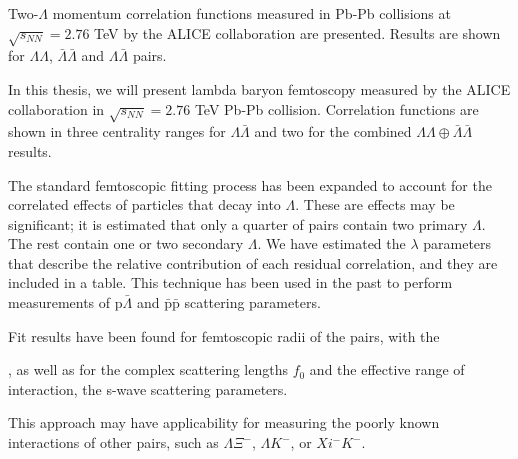 Two-$\Lambda$ momentum correlation functions measured in Pb-Pb collisions at $\sqrt{s_{NN}}=2.76$ TeV by the ALICE collaboration are presented.  Results are shown for $\Lambda\Lambda$, $\bar{\Lambda}\bar{\Lambda}$ and $\Lambda\bar{\Lambda}$ pairs.


In this thesis, we will present lambda baryon femtoscopy measured by the ALICE collaboration in $\sqrt{s_{NN}}=2.76$ TeV Pb-Pb collision.
Correlation functions are shown in three centrality ranges for $\Lambda\bar{\Lambda}$ and two for the combined $\Lambda\Lambda\oplus\bar{\Lambda}\bar{\Lambda}$ results.


The standard femtoscopic fitting process has been expanded to account for the correlated effects of particles that decay into $\Lambda$. %
These are effects may be significant; it is estimated that only a quarter of pairs contain two primary $\Lambda$.
The rest contain one or two secondary $\Lambda$.
We have estimated the $\lambda$ parameters that describe the relative contribution of each residual correlation, and they are included in a table.
This technique has been used in the past to perform measurements of $\mathrm{p}\bar{\Lambda}$ and $\bar{\mathrm{p}}\bar{\mathrm{p}}$ scattering parameters.



Fit results have been found for femtoscopic radii of the pairs, with the 

, as well as for the complex scattering lengths $f_0$ and the effective range of interaction, the s-wave scattering parameters.

This approach may have applicability for measuring the poorly known interactions of other pairs, such as $\Lambda\Xi^-$, $\Lambda K^-$, or $Xi^-K^-$.